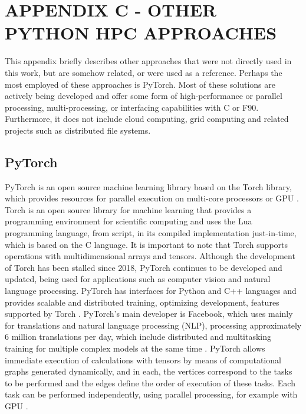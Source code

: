 \renewcommand{\thechapter}{C}
\chapter{APPENDIX C - OTHER PYTHON HPC APPROACHES}
\label{appendixC}

This appendix briefly describes other approaches that were not directly used in this work, but are somehow related, or were used as a reference. Perhaps the most employed of these approaches is PyTorch. Most of these solutions are actively being developed and offer some form of high-performance or parallel processing, multi-processing, or interfacing capabilities with C or F90. Furthermore, it does not include cloud computing, grid computing and related projects such as distributed file systems.




\section{PyTorch}
\label{sec_apprpyto}

PyTorch is an open source machine learning library based on the Torch library, which provides resources for parallel execution on multi-core processors or GPU \cite{Ketkar2017, Imambi2021}. Torch is an open source library for machine learning that provides a programming environment for scientific computing and uses the Lua programming language, from script, in its compiled implementation just-in-time, which is based on the C language. It is important to note that Torch supports operations with multidimensional arrays and tensors. Although the development of Torch has been stalled since 2018, PyTorch continues to be developed and updated, being used for applications such as computer vision and natural language processing. PyTorch has interfaces for Python and C++ languages and provides scalable and distributed training, optimizing development, features supported by Torch \cite{Collobert2002}. PyTorch's main developer is Facebook, which uses mainly for translations and natural language processing (NLP), processing approximately 6 million translations per day, which include distributed and multitasking training for multiple complex models at the same time \cite{Ketkar2017} . PyTorch allows immediate execution of calculations with tensors by means of computational graphs generated dynamically, and in each, the vertices correspond to the tasks to be performed and the edges define the order of execution of these tasks. Each task can be performed independently, using parallel processing, for example with GPU \cite{Fey2019}.





